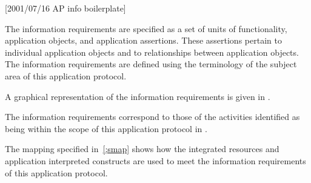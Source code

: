 [2001/07/16 AP info boilerplate]

  The information requirements are specified as a set of
units of functionality, application objects, and
application assertions. These assertions pertain to
individual application objects and to relationships
between application objects. The information requirements
are defined using the terminology of the subject area of
this application protocol.

\begin{note}A graphical representation of the information
      requirements is given in .\end{note}
\begin{note}The information requirements correspond to those of
      the activities identified as being within the scope of this
      application protocol in .\end{note}
\begin{note}The mapping \maptableorspec{}
      specified in~\ref{;smap} shows how the
      integrated  resources
      \ifaicinap and application interpreted constructs \fi
      are used to meet the information requirements of this
      application protocol. \end{note}

\endinput
